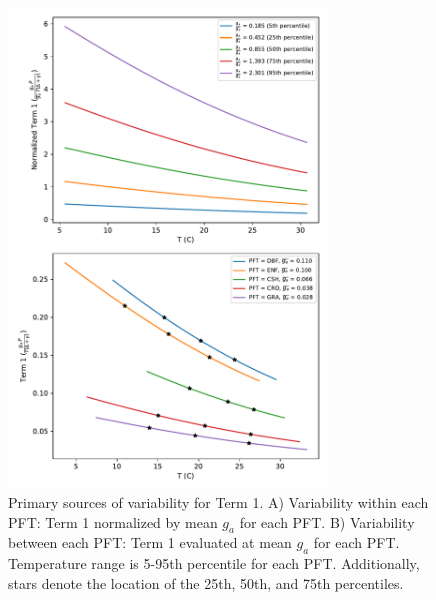 \documentclass[draft,linenumbers]{agujournal}
\begin{document}
\begin{figure}[h]
\centering
\includegraphics[width=20pc]{./fig04.pdf}
\caption{Primary sources of variability for Term 1. A) Variability within each PFT: Term 1 normalized by mean $g_a$ for each PFT. B) Variability between each PFT: Term 1 evaluated at mean $g_a$ for each PFT. Temperature range is 5-95th percentile for each PFT. Additionally, stars denote the location of the 25th, 50th, and 75th percentiles.}
\label{scale_vary}
\end{figure}

\end{document}
